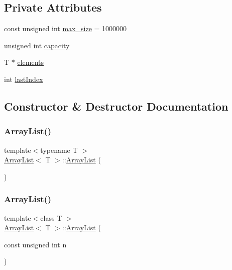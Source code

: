 \subsection*{Private Attributes}
\begin{DoxyCompactItemize}
\item 
const unsigned int \hyperlink{class_array_list_ab4aa4eb35267e0f92e6ac4f748c9974e}{max\+\_\+size} = 1000000
\item 
unsigned int \hyperlink{class_array_list_a00ce7409fee400cc2b756714297e4085}{capacity}
\item 
T $\ast$ \hyperlink{class_array_list_a41c2a7b127fca888e75a6fca13cc043d}{elements}
\item 
int \hyperlink{class_array_list_aad2f93761ddbe2404729a68178c228b7}{last\+Index}
\end{DoxyCompactItemize}


\subsection{Constructor \& Destructor Documentation}
\mbox{\label{class_array_list_a77ba51ae82bb2246563af5c4d64d438e}} 
\subsubsection{\texorpdfstring{Array\+List()}{ArrayList()}\hspace{0.1cm}{\footnotesize\ttfamily [1/2]}}
{\footnotesize\ttfamily template$<$typename T $>$ \\
\hyperlink{class_array_list}{Array\+List}$<$ T $>$\+::\hyperlink{class_array_list}{Array\+List} (\begin{DoxyParamCaption}{ }\end{DoxyParamCaption})}

\mbox{\label{class_array_list_a89b4c5051ae22e38927da22da6d8dcce}} 
\subsubsection{\texorpdfstring{Array\+List()}{ArrayList()}\hspace{0.1cm}{\footnotesize\ttfamily [2/2]}}
{\footnotesize\ttfamily template$<$class T $>$ \\
\hyperlink{class_array_list}{Array\+List}$<$ T $>$\+::\hyperlink{class_array_list}{Array\+List} (\begin{DoxyParamCaption}\item[{const unsigned int}]{n }\end{DoxyParamCaption})}

